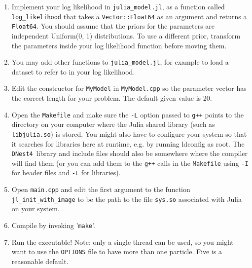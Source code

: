 \documentclass[a4paper, 11pt]{article}
\newcommand{\dnest}{{\tt DNest4}}
\begin{document}
\begin{enumerate}
\item Implement your log likelihood in {\tt julia\_model.jl}, as a function
	called {\tt log\_likelihood} that takes a {\tt Vector::Float64} as an argument
	and returns a {\tt Float64}. You should assume that the priors for the
	parameters are independent Uniform(0, 1) distributions. To use
	a different prior, transform the parameters inside
	your log likelihood function before moving them.\\
\item You may add other functions to {\tt julia\_model.jl}, for example to load
	a dataset to refer to in your log likelihood.\\
\item Edit the constructor for {\tt MyModel} in {\tt MyModel.cpp} so the parameter
	vector has the correct length for your problem. The default given value
	is 20.\\
\item Open the {\tt Makefile} and make sure the {\tt -L} option passed to
	{\tt g++} points to the
	directory on your computer where the Julia shared library (such
	as {\tt libjulia.so}) is stored. You might also have to configure your
	system so that it searches for libraries here at runtime, e.g.
	by running ldconfig as root. The \dnest~library and include files should
	also be somewhere where the compiler will find them (or you can add them
	to the {\tt g++} calls in the {\tt Makefile} using {\tt -I} for header
	files and {\tt -L} for libraries).\\
\item Open {\tt main.cpp} and edit the first argument to the function
	{\tt jl\_init\_with\_image} to be the path to the file {\tt sys.so} associated with
	Julia on your system.\\
\item Compile by invoking '{\tt make}'.\\
\item Run the executable! Note: only a single thread can be used, so you might want
	to use the {\tt OPTIONS} file to have more than one particle. Five is a
	reasonable default.
\end{enumerate}
\end{document}

